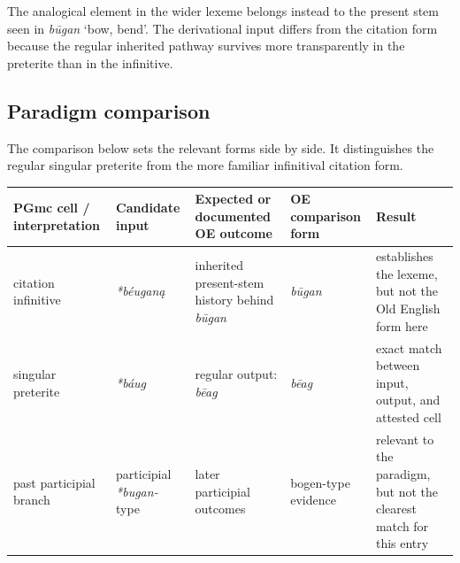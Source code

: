 \documentclass[
  british,
  a4paper,
  openany]{book}
\newcounter{none} %
\begin{document}
The analogical element in the wider lexeme belongs instead to the
present stem seen in {\emph{būgan}} `bow, bend'. The derivational input
differs from the citation form because the regular inherited pathway
survives more transparently in the preterite than in the infinitive.

\subsection{Paradigm comparison}\label{paradigm-comparison-2}

The comparison below sets the relevant forms side by side. It
distinguishes the regular singular preterite from the more familiar
infinitival citation form.

{\def\LTcaptype{none} %
\begin{longtable}[]{@{}
  >{\raggedright\arraybackslash}p{}
  >{\raggedright\arraybackslash}p{}
  >{\raggedright\arraybackslash}p{}
  >{\raggedright\arraybackslash}p{}
  >{\raggedright\arraybackslash}p{}@{}}
\toprule\noalign{}
\begin{minipage}[b]{\linewidth}\raggedright
PGmc cell / interpretation
\end{minipage} & \begin{minipage}[b]{\linewidth}\raggedright
Candidate input
\end{minipage} & \begin{minipage}[b]{\linewidth}\raggedright
Expected or documented OE outcome
\end{minipage} & \begin{minipage}[b]{\linewidth}\raggedright
OE comparison form
\end{minipage} & \begin{minipage}[b]{\linewidth}\raggedright
Result
\end{minipage} \\
\midrule\noalign{}
\endhead
\bottomrule\noalign{}
\endlastfoot
citation infinitive & {\emph{*béuganą}} & inherited present-stem history
behind {\emph{būgan}} & {\emph{būgan}} & establishes the lexeme, but not
the Old English form here \\
singular preterite & {\emph{*báug}} & regular output: {\emph{bēag}} &
{\emph{bēag}} & exact match between input, output, and attested cell \\
past participial branch & participial \emph{*bugan-} type & later
participial outcomes & bogen-type evidence & relevant to the paradigm,
but not the clearest match for this entry \\
\end{longtable}
}
\end{document}
